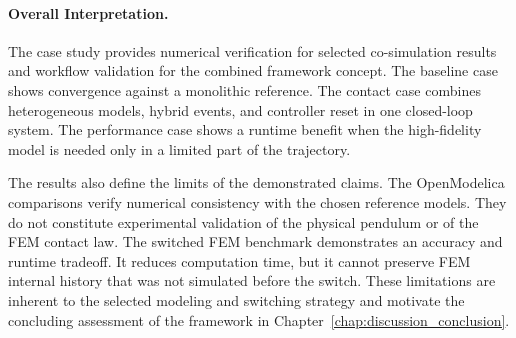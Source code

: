 \paragraph{Overall Interpretation.}
The case study provides numerical verification for selected co-simulation results and workflow validation for the combined framework concept.
The baseline case shows convergence against a monolithic reference.
The contact case combines heterogeneous models, hybrid events, and controller reset in one closed-loop system.
The performance case shows a runtime benefit when the high-fidelity model is needed only in a limited part of the trajectory.

The results also define the limits of the demonstrated claims.
The OpenModelica comparisons verify numerical consistency with the chosen reference models.
They do not constitute experimental validation of the physical pendulum or of the \ac{FEM} contact law.
The switched \ac{FEM} benchmark demonstrates an accuracy and runtime tradeoff.
It reduces computation time, but it cannot preserve \ac{FEM} internal history that was not simulated before the switch.
These limitations are inherent to the selected modeling and switching strategy and motivate the concluding assessment of the framework in Chapter~\ref{chap:discussion_conclusion}.

